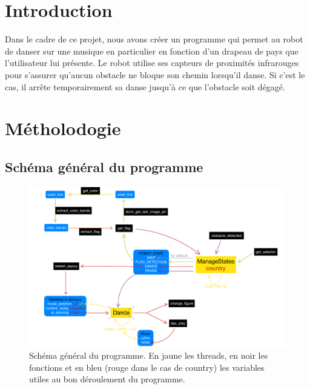 \documentclass{article}
\begin{document}
    \thispagestyle{empty}

    \tableofcontents

    \newpage

    \setcounter{page}{1}

    \section{Introduction}

    Dans le cadre de ce projet, nous avons créer un programme qui permet au robot de danser sur une musique en particulier en fonction d'un drapeau de pays que l'utilisateur lui présente. Le robot utilise ses capteurs de proximités infrarouges pour s'assurer qu'aucun obstacle ne bloque son chemin lorsqu'il danse. Si c'est le cas, il arrête temporairement sa danse jusqu'à ce que l'obstacle soit dégagé.

    \section{Métholodogie}
    
    \subsection{Schéma général du programme}
    \begin{figure}[!ht]
    \includegraphics[scale=0.75]{docs/rapport/images/Structure_Code.pdf}
    \caption{Schéma général du programme. En jaune les threads, en noir les fonctions et en bleu (rouge dans le cas de country) les variables utiles au bon déroulement du programme.}
    \label{fig:structure} %
\end{figure}
\end{document}
